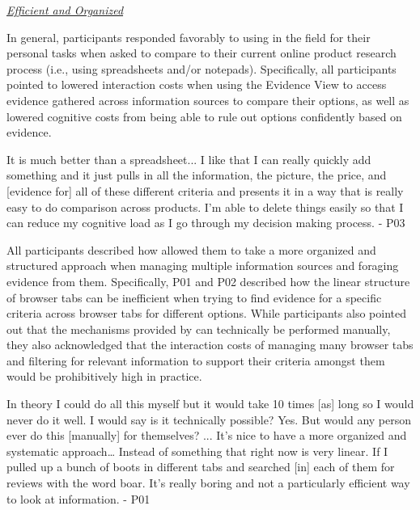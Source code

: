 \emph{\underline{Efficient and Organized}}

In general, participants responded favorably to using \SYSTEM in the field for their personal tasks when asked to compare \SYSTEM to their current online product research process (i.e., using spreadsheets and/or notepads). Specifically, all participants pointed to lowered interaction costs when using the Evidence View to access evidence gathered across information sources to compare their options, as well as lowered cognitive costs from being able to rule out options confidently based on evidence.

\begin{tightquote}
 
It is much better than a spreadsheet... I like that I can really quickly add something and it just pulls in all the information, the picture, the price, and [evidence for] all of these different criteria and presents it in a way that is really easy to do comparison across products. I'm able to delete things easily so that I can reduce my cognitive load as I go through my decision making process. - P03

\end{tightquote}

All participants described how \SYSTEM allowed them to take a more organized and structured approach when managing multiple information sources and foraging evidence from them. Specifically, P01 and P02 described how the linear structure of browser tabs can be inefficient when trying to find evidence for a specific criteria across browser tabs for different options. While participants also pointed out that the mechanisms provided by \SYSTEM can technically be performed manually, they also acknowledged that the interaction costs of managing many browser tabs and filtering for relevant information to support their criteria amongst them would be prohibitively high in practice.

\begin{tightquote}

In theory I could do all this myself but it would take 10 times [as] long so I would never do it well. I would say is it technically possible? Yes. But would any person ever do this [manually] for themselves? ...  It's nice to have a more organized and systematic approach… Instead of something that right now is very linear. If I pulled up a bunch of boots in different tabs and searched [in] each of them for reviews with the word boar. It's really boring and not a particularly efficient way to look at information. - P01

\end{tightquote}

